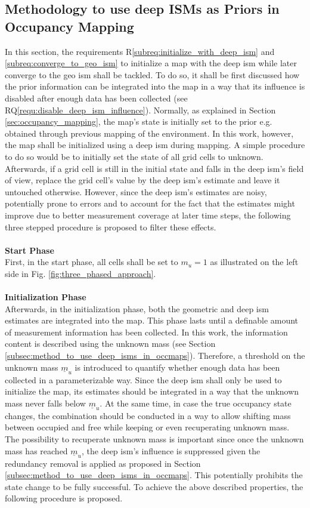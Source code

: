 \subsection{Methodology to use deep ISMs as Priors in Occupancy Mapping}
\label{subsec:method_to_use_deep_isms_as_priors_in_occmaps}
In this section, the requirements R\ref{subreq:initialize_with_deep_ism} and \ref{subreq:converge_to_geo_ism} to initialize a map with the deep \gls{ism} while later converge to the geo \gls{ism} shall be tackled. To do so, it shall be first discussed how the prior information can be integrated into the map in a way that its influence is disabled after enough data has been collected (see RQ\ref{requ:disable_deep_ism_influence}). Normally, as explained in Section \ref{sec:occupancy_mapping}, the map's state is initially set to the prior e.g. obtained through previous mapping of the environment. In this work, however, the map shall be initialized using a deep \gls{ism} during mapping. A simple procedure to do so would be to initially set the state of all grid cells to unknown. Afterwards, if a grid cell is still in the initial state and falls in the deep \gls{ism}'s field of view, replace the grid cell's value by the deep \gls{ism}'s estimate and leave it untouched otherwise. However, since the deep \gls{ism}'s estimates are noisy, potentially prone to errors and to account for the fact that the estimates might improve due to better measurement coverage at later time steps, the following three stepped procedure is proposed to filter these effects. 
\\\\
\textbf{Start Phase}\\
First, in the start phase, all cells shall be set to $m_u = 1$ as illustrated on the left side in Fig. \ref{fig:three_phased_approach}. 
\\\\
\textbf{Initialization Phase}\\
Afterwards, in the initialization phase, both the geometric and deep \gls{ism} estimates are integrated into the map. This phase lasts until a definable amount of measurement information has been collected. In this work, the information content is described using the unknown mass (see Section \ref{subsec:method_to_use_deep_isms_in_occmaps}). Therefore, a threshold on the unknown mass $\underline{m}_u$ is introduced to quantify whether enough data has been collected in a parameterizable way. Since the deep \gls{ism} shall only be used to initialize the map, its estimates should be integrated in a way that the unknown mass never falls below $\underline{m}_u$. At the same time, in case the true occupancy state changes, the combination should be conducted in a way to allow shifting mass between occupied and free while keeping or even recuperating unknown mass. The possibility to recuperate unknown mass is important since once the unknown mass has reached $\underline{m}_u$, the deep \gls{ism}'s influence is suppressed given the redundancy removal is applied as proposed in Section \ref{subsec:method_to_use_deep_isms_in_occmaps}. This potentially prohibits the state change to be fully successful. To achieve the above described properties, the following procedure is proposed.
